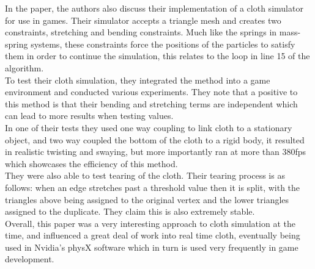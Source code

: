 \documentclass[12pt,a4paper]{article}
\begin{document}
In the paper, the authors also discuss their implementation of a cloth simulator for use in games. Their simulator accepts a triangle mesh and creates two constraints, stretching and bending constraints. Much like the springs in mass-spring systems, these constraints force the positions of the particles to satisfy them in order to continue the simulation, this relates to the loop in line 15 of the algorithm.
\\
To test their cloth simulation, they integrated the method into a game environment and conducted various experiments. They note that a positive to this method is that their bending and stretching terms are independent which can lead to more results when testing values. \\ 
In one of their tests they used one way coupling to link cloth to a stationary object, and two way coupled the bottom of the cloth to a rigid body, it resulted in realistic twisting and swaying, but more importantly ran at more than 380fps which showcases the efficiency of this method. \\
They were also able to test tearing of the cloth. Their tearing process is as follows: when an edge stretches past a threshold value then it is split, with the triangles above being assigned to the original vertex and the lower triangles assigned to the duplicate. They claim this is also extremely stable.\\

Overall, this paper was a very interesting approach to cloth simulation at the time, and influenced a great deal of work into real time cloth, eventually being used in Nvidia's physX software which in turn is used very frequently in game development.
\end{document}
